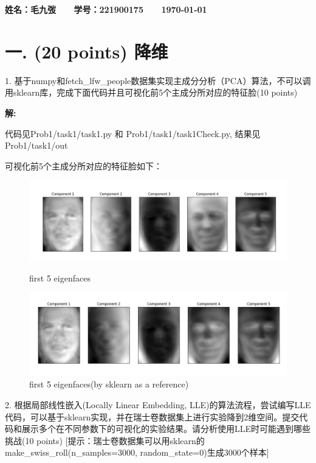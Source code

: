 \documentclass[8pt]{article}
\begin{document}
\textbf{\color{blue} \Large 姓名：毛九弢 \ \ \ 学号：221900175 \ \ \ \today}

\section*{一. (20 points) 降维}
1. 基于numpy和fetch\_lfw\_people数据集实现主成分分析（PCA）算法，不可以调用sklearn库，完成下面代码并且可视化前5个主成分所对应的特征脸(10 points)

\textbf{\large 解:}

{\color{red}代码见Prob1/task1/task1.py 和 Prob1/task1/task1Check.py, 结果见Prob1/task1/out}

可视化前5个主成分所对应的特征脸如下：
\begin{figure}[H]
    \centering
    \begin{minipage}{\textwidth}
        \includegraphics[width=\textwidth]{./Prob1/task1/out/task1_Eigenfaces.png}
        \caption{first 5 eigenfaces}
        \label{fig:task1 Eigenfaces Mine}
    \end{minipage}
    \hfill
    \begin{minipage}{\textwidth}
        \includegraphics[width=\textwidth]{./Prob1/task1/out/task1Check.png}
        \caption{first 5 eigenfaces(by sklearn as a reference)}
        \label{fig:task1 Eigenfaces Check}
    \end{minipage}
\end{figure}

2. 根据局部线性嵌入(Locally Linear Embedding, LLE)的算法流程，尝试编写LLE代码，可以基于sklearn实现，并在瑞士卷数据集上进行实验降到2维空间。提交代码和展示多个在不同参数下的可视化的实验结果。请分析使用LLE时可能遇到哪些挑战(10 points) [提示：瑞士卷数据集可以用sklearn的make\_swiss\_roll(n\_samples=3000, random\_state=0)生成3000个样本]
\end{document}
